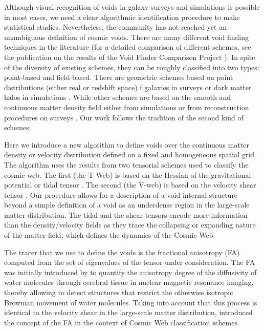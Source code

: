 \documentclass[a4,useAMS,usenatbib,usegraphicx]{mn2e}
\begin{document}
Although visual recognition of voids in galaxy surveys and simulations
is possible in most cases, we need a clear algorithmic identification
procedure to make statistical studies.
Nevertheless, the community has not reached yet an unambiguous
definition of cosmic voids.
There are many different void finding techniques in the literature
(for a detailed comparison of different schemes,  see the publication
on the results of the Void Finder Comparison Project \citet{Colberg08}).  
In spite of the diversity of existing schemes, they can be roughly
classified into two types: point-based and field-based. 
There are geometric schemes based on point distributions (either real or
redshift space)  f galaxies in surveys or dark matter halos in
simulations \citep{Kauffmann91, Muller00,    Gottlober03, Hoyle04,
  Brunino07,  Foster09, Micheletti14, Sutter14}. 
While other schemes are based on the smooth and continuous matter density
field either from simulations or from reconstruction procedures on
surveys \citep{Plionis02, Colberg05,  Shandarin06, Platen07,
  Neyrinck08, MunozCuartas11, Neyrinck13, Ricciardelli2013}. 
Our work follows the tradition of the second kind of schemes. 


Here we introduce a new algorithm to define voids over the continuous
matter density or velocity distribution defined on a fixed and
homogeneous spatial grid.
The algorithm uses the results from two tensorial schemes used to
classify the cosmic web.
The first (the T-Web) is based on the Hessian of the gravitational potential or
tidal tensor \citep{Hahn07, Forero09}. 
The second (the V-web) is based on the velocity shear tensor
\citep{Hoffman12}. 
Our procedure allows for a description of a void internal structure
beyond a simple definition of a void as an underdense region in the
large-scale matter distribution. 
The tidal and the shear tensors
encode more information than the density/velocity fields as they trace
the collapsing or expanding nature of the matter field, which defines
the dynamics of the Cosmic Web.  


The tracer that we use to define the voids is the fractional
anisotropy (FA) computed from the set of eigenvalues of the tensor
under consideration. 
The FA was initially introduced by \citet{Basser95} to quantify the
anisotropy degree of the diffusivity of water molecules through
cerebral tissue in nuclear magnetic resonance imaging, thereby allowing to 
detect structures that restrict the otherwise isotropic Brownian movement 
of water molecules. Taking into account that this process is identical to 
the velocity shear in the large-scale matter distribution, 
\citet{Libeskind13} introduced the concept of the FA in the context of 
Cosmic Web classification schemes.
\end{document}
